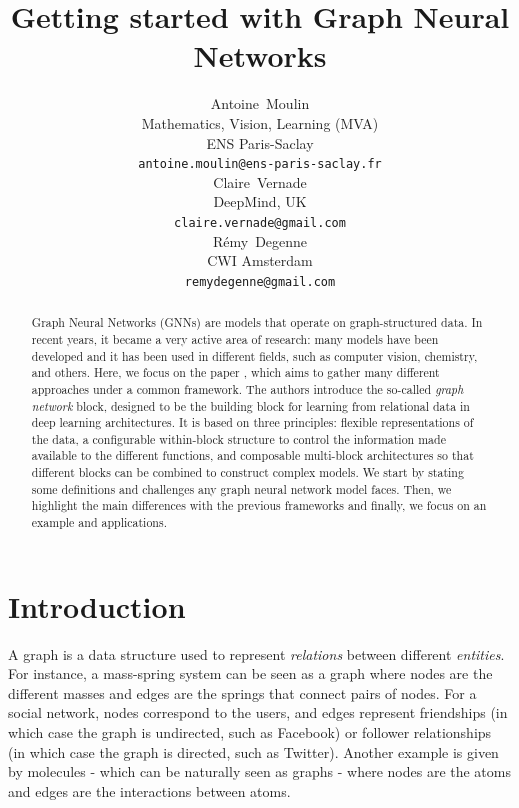 \documentclass{article}
\title{Getting started with Graph Neural Networks}
\author{
  Antoine~Moulin\\
  Mathematics, Vision, Learning (MVA)\\
  ENS Paris-Saclay\\
  \texttt{antoine.moulin@ens-paris-saclay.fr}\\
  \And
  Claire~Vernade\\
  DeepMind, UK\\
  \texttt{claire.vernade@gmail.com}\\
  \And
  Rémy~Degenne\\
  CWI Amsterdam\\
  \texttt{remydegenne@gmail.com}\\
}
\begin{document}
\maketitle


\begin{abstract}
    Graph Neural Networks (GNNs) are models that operate on graph-structured data. In recent years, it became a very active area of research: many models have been developed and it has been used in different fields, such as computer vision, chemistry, and others. Here, we focus on the paper \cite[Battaglia et al. 2018]{battaglia2018relational}, which aims to gather many different approaches under a common framework. The authors introduce the so-called \emph{graph network} block, designed to be the building block for learning from relational data in deep learning architectures. It is based on three principles: flexible representations of the data, a configurable within-block structure to control the information made available to the different functions, and composable multi-block architectures so that different blocks can be combined to construct complex models. We start by stating some definitions and challenges any graph neural network model faces. Then, we highlight the main differences with the previous frameworks and finally, we focus on an example and applications.
\end{abstract}



\section{Introduction}
\label{sec:introduction}

A graph is a data structure used to represent \emph{relations} between different \emph{entities}. For instance, a mass-spring system can be seen as a graph where nodes are the different masses and edges are the springs that connect pairs of nodes. For a social network, nodes correspond to the users, and edges represent friendships (in which case the graph is undirected, such as Facebook) or follower relationships (in which case the graph is directed, such as Twitter). Another example is given by molecules - which can be naturally seen as graphs - where nodes are the atoms and edges are the interactions between atoms.
\end{document}
